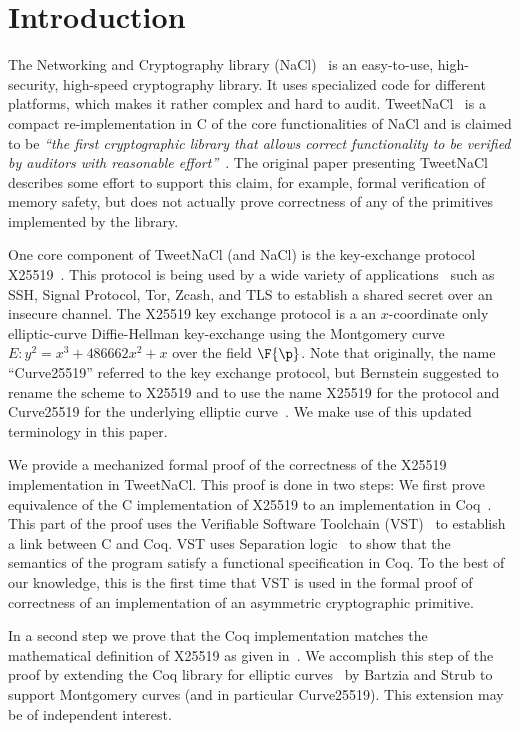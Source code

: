 \section{Introduction}
\label{sec:intro}

The Networking and Cryptography library (NaCl)~\cite{BLS12}
is an easy-to-use, high-security, high-speed cryptography library.
It uses specialized code for different platforms, which makes it rather complex and hard to audit.
TweetNaCl~\cite{BGJ+15} is a compact re-implementation in C
of the core functionalities of NaCl and is claimed to be
\emph{``the first cryptographic library that allows correct functionality
to be verified by auditors with reasonable effort''}~\cite{BGJ+15}.
The original paper presenting TweetNaCl describes some effort to support
this claim, for example, formal verification of memory safety, but does not actually
prove correctness of any of the primitives implemented by the library.

One core component of TweetNaCl (and NaCl) is the key-exchange protocol X25519~\cite{rfc7748}.
This protocol is being used by a wide variety of applications~\cite{things-that-use-curve25519}
such as SSH, Signal Protocol, Tor, Zcash, and TLS to establish a shared secret over
an insecure channel.
The X25519 key exchange protocol is a an $x$-coordinate only
elliptic-curve Diffie-Hellman key-exchange using the Montgomery
curve $E: y^2 = x^3 + 486662 x^2 + x$ over the field $\F{\p}$.
Note that originally, the name ``Curve25519'' referred to the key exchange protocol,
but Bernstein suggested to rename the scheme to X25519 and to use the name
X25519 for the protocol and Curve25519 for the underlying elliptic curve~\cite{Ber14}.
We make use of this updated terminology in this paper.

We provide a mechanized formal proof of the correctness of the X25519
implementation in TweetNaCl.
This proof is done in two steps:
We first prove equivalence of the C implementation of X25519
to an implementation in Coq~\cite{coq-faq}.
This part of the proof uses the Verifiable Software Toolchain (VST)~\cite{2012-Appel}
to establish a link between C and Coq.
VST uses Separation logic~\cite{1969-Hoare,Reynolds02separationlogic}
to show that the semantics of the program satisfy a functional specification in Coq.
To the best of our knowledge, this is the first time that
VST is used in the formal proof of correctness of an implementation
of an asymmetric cryptographic primitive.

In a second step we prove that the Coq implementation matches
the mathematical definition of X25519 as given in~\cite[Sec.~2]{Ber06}.
We accomplish this step of the proof by extending the Coq library
for elliptic curves~\cite{BartziaS14} by Bartzia and Strub to
support Montgomery curves (and in particular Curve25519).
This extension may be of independent interest.

